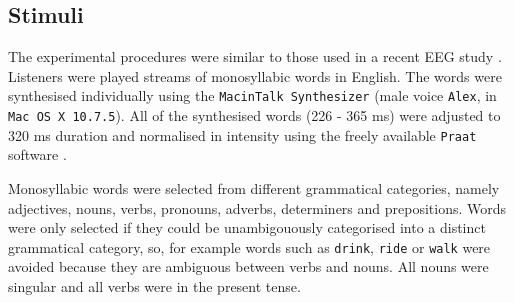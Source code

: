 \documentclass[10pt,letterpaper]{article}
\newcommand{\citet}[1]{\cite{#1}}
\begin{document}
\subsection*{Stimuli}

The experimental procedures were similar to those used in a recent EEG
study \cite{DingEtAl2017}. Listeners were played streams of
monosyllabic words in English. The words were synthesised individually
using the \texttt{MacinTalk Synthesizer} (male voice \texttt{Alex}, in
\texttt{Mac OS X 10.7.5}). All of the synthesised words (226 - 365 ms)
were adjusted to 320 ms duration and normalised in intensity using the
freely available \texttt{Praat} software \citet{Praat}.

Monosyllabic words were selected from different grammatical categories,
namely adjectives, nouns, verbs, pronouns, adverbs, determiners and
prepositions. Words were only selected if they could be unambigouously
categorised into a distinct grammatical category, so, for example
words such as \texttt{drink}, \texttt{ride} or \texttt{walk} were
avoided because they are ambiguous between verbs and nouns. All nouns
were singular and all verbs were in the present tense.
\end{document}
